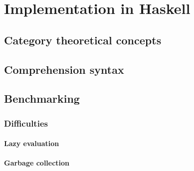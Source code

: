 \section{Implementation in Haskell}
\subsection{Category theoretical  concepts}
\subsection{Comprehension syntax}
\subsection{Benchmarking}
\subsubsection{Difficulties}
\paragraph{Lazy evaluation}
\paragraph{Garbage collection}
